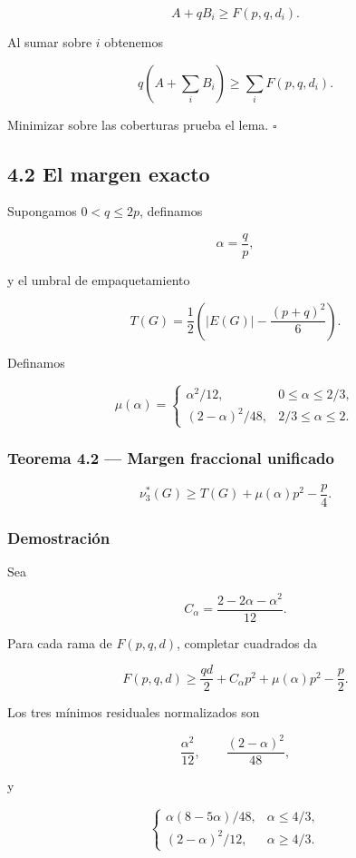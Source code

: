 \documentclass[
  spanish,
  11pt,
  a4paper,
]{article}
\begin{document}
\[
A+qB_i\ge F(p,q,d_i).
\]

Al sumar sobre \(i\) obtenemos

\[
q\left(A+\sum_iB_i\right)
\ge
\sum_iF(p,q,d_i).
\]

Minimizar sobre las coberturas prueba el lema. \(\square\)

\subsection{4.2 El margen exacto}\label{el-margen-exacto}

Supongamos \(0<q\le2p\), definamos

\[
\alpha=\frac qp,
\]

y el umbral de empaquetamiento

\[
T(G)=\frac12\left(|E(G)|-\frac{(p+q)^2}{6}\right).
\tag{4.2}
\]

Definamos

\[
\mu(\alpha)
=
\begin{cases}
\alpha^2/12,&0\le\alpha\le2/3,\\
(2-\alpha)^2/48,&2/3\le\alpha\le2.
\end{cases}
\tag{4.3}
\]

\subsubsection{Teorema 4.2 --- Margen fraccional unificado}\label{teorema-4.2-margen-fraccional-unificado}

\[
\boxed{
\nu_3^*(G)
\ge
T(G)+\mu(\alpha)p^2-\frac p4.
}
\tag{4.4}
\]

\subsubsection{Demostración}\label{demostraciuxf3n-2}

Sea

\[
C_\alpha=\frac{2-2\alpha-\alpha^2}{12}.
\]

Para cada rama de \(F(p,q,d)\), completar cuadrados da

\[
F(p,q,d)
\ge
\frac{qd}{2}+C_\alpha p^2+\mu(\alpha)p^2-\frac p2.
\tag{4.5}
\]

Los tres mínimos residuales normalizados son

\[
\frac{\alpha^2}{12},
\qquad
\frac{(2-\alpha)^2}{48},
\]

y

\[
\begin{cases}
\alpha(8-5\alpha)/48,&\alpha\le4/3,\\
(2-\alpha)^2/12,&\alpha\ge4/3.
\end{cases}
\]
\end{document}
